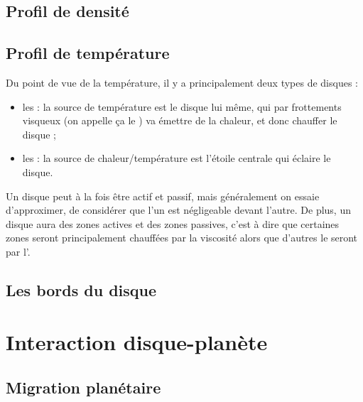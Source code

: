 
\subsection{Profil de densité}
\subsection{Profil de température}
Du point de vue de la température, il y a principalement deux types de disques : 
\begin{itemize}
\item les  : la source de température est le disque lui même, qui par frottements visqueux (on appelle ça le ) va émettre de la chaleur, et donc chauffer le disque ;
\item les  : la source de chaleur/température est l'étoile centrale qui éclaire le disque. 
\end{itemize}

Un disque peut à la fois être actif et passif, mais généralement on essaie d'approximer, de considérer que l'un est négligeable devant l'autre. De plus, un disque aura des zones actives et des zones passives, c'est à dire que certaines zones seront principalement chauffées par la viscosité alors que d'autres le seront par l'.

\subsection{Les bords du disque}

\section{Interaction disque-planète}
\subsection{Migration planétaire}
